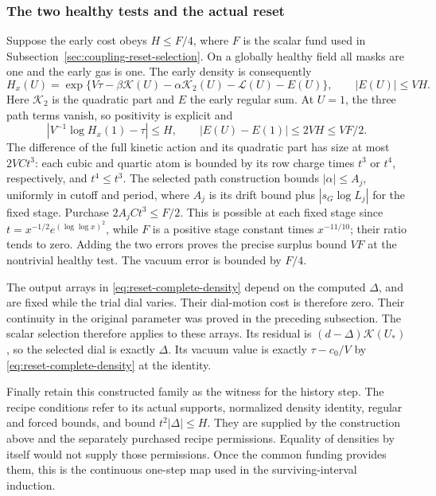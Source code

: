 \subsubsection{The two healthy tests and the actual reset}
Suppose the early cost obeys $H\le F/4$, where $F$ is the scalar
fund used in Subsection~\ref{sec:coupling-reset-selection}. On a globally
healthy field all masks are one and the early gas is one. The early
density is consequently
\[
 H_x(U)=\exp\{V\tau-\beta\mathcal K(U)
                         -\alpha\mathcal K_2(U)-\mathcal L(U)-E(U)\},
 \qquad |E(U)|\le VH.
\]
Here $\mathcal K_2$ is the quadratic part and $E$ the early regular
sum. At $U=1$, the three path terms vanish, so positivity is explicit
and
\[
 \left|V^{-1}\log H_x(1)-\tau\right|\le H,\qquad
 |E(U)-E(1)|\le2VH\le VF/2.
\]
The difference of the full kinetic action and its quadratic part has
size at most $2VCt^3$: each cubic and quartic atom is bounded by its
row charge times $t^3$ or $t^4$, respectively, and $t^4\le t^3$.
The selected path construction bounds
$|\alpha|\le A_j$, uniformly in cutoff and period, where
$A_j$ is its drift bound plus $|s_G\log L_j|$ for the fixed stage.
Purchase $2A_jCt^3\le F/2$. This is possible at each fixed stage since $t=x^{-1/2}e^{(\log\log x)^2}$, while $F$ is a
positive stage constant times $x^{-11/10}$; their ratio tends to
zero. Adding the two errors proves the precise surplus bound $VF$
at the nontrivial healthy test. The vacuum error is bounded by $F/4$.

The output arrays in \eqref{eq:reset-complete-density} depend on the
computed $\Delta$, and are fixed while the trial dial varies. Their
dial-motion cost is therefore zero. Their continuity in the original
parameter was proved in the preceding subsection. The scalar selection
therefore applies to these arrays. Its residual is
$(d-\Delta)\mathcal K(U_*)$, so the selected dial is exactly
$\Delta$. Its vacuum value is exactly $\tau-c_0/V$ by
\eqref{eq:reset-complete-density} at the identity.

Finally retain this constructed family as the witness for the
history step. The recipe conditions refer to its actual supports,
normalized density identity, regular and forced bounds, and bound
$t^2|\Delta|\le H$. They are supplied by the construction above and
the separately purchased recipe permissions. Equality of densities
by itself would not supply those permissions. Once the common funding
provides them, this is the continuous one-step map used in the
surviving-interval induction.
